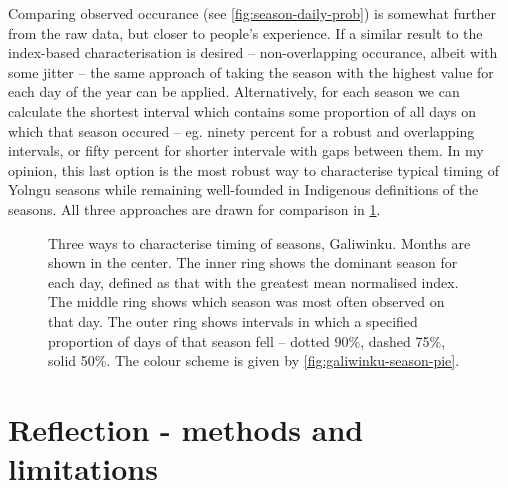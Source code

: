 Comparing observed occurance (see \cref{fig:season-daily-prob}) is somewhat
further from the raw data, but closer to people's experience.  If a similar
result to the index-based characterisation is desired -- non-overlapping
occurance, albeit with some jitter -- the same approach of taking the season
with the highest value for each day of the year can be applied.
%
Alternatively, for each season we can calculate the shortest interval which
contains some proportion of all days on which that season occured -- eg.
ninety percent for a robust and overlapping intervals, or fifty percent for
shorter intervale with gaps between them.  In my opinion, this last option
is the most robust way to characterise typical timing of Yolngu seasons while
remaining well-founded in Indigenous definitions of the seasons.
%
All three approaches are drawn for comparison in \cref{fig:galiwinku-seasons}.


\begin{figure}[h]
    \centering
    \vspace{1.5in} \vspace{1.5in}
    \caption[Three ways to characterise timing of seasons, Galiwinku]{
        Three ways to characterise timing of seasons, Galiwinku.
        Months are shown in the center.  The inner ring shows the dominant season
        for each day, defined as that with the greatest mean normalised index.
        The middle ring shows which season was most often observed on that day.
        The outer ring shows intervals in which a specified proportion of days
        of that season fell -- dotted 90\%, dashed 75\%, solid 50\%.
        The colour scheme is given by \cref{fig:galiwinku-season-pie}.
        }
    \label{fig:galiwinku-seasons}
\end{figure}




\section{Reflection - methods and limitations}
\label{sec:disc-reflection}






